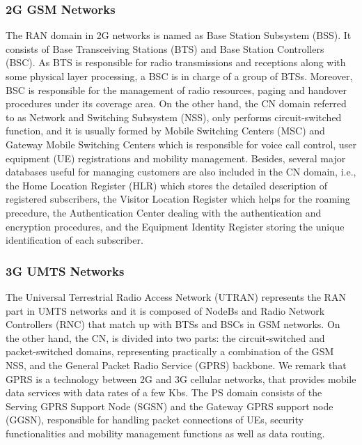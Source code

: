\subsubsection*{2G GSM Networks}
The RAN domain in 2G networks is named as Base Station Subsystem (BSS). It consists of Base Transceiving Stations (BTS) and Base Station Controllers (BSC). As BTS is responsible for radio transmissions and receptions along with some physical layer processing, a BSC is in charge of a group of BTSs. Moreover, BSC is responsible for the management of radio resources, paging and handover procedures under its coverage area. On the other hand, the CN domain referred to as Network and Switching Subsystem (NSS), only performs circuit-switched function, and it is usually formed by Mobile Switching Centers (MSC) and Gateway Mobile Switching Centers which is responsible for voice call control, user equipment (UE) registrations and mobility management. Besides, several major databases useful for managing customers are also included in the CN domain, i.e., the Home Location Register (HLR) which stores the detailed description of registered subscribers, the Visitor Location Register which helps for the roaming precedure, the Authentication Center dealing with the authentication and encryption procedures, and the Equipment Identity Register storing the unique identification of each subscriber.

\subsubsection*{3G UMTS Networks}
The Universal Terrestrial Radio Access Network (UTRAN) represents the RAN part in UMTS networks and it is composed of NodeBs and Radio Network Controllers (RNC) that match up with BTSs and BSCs in GSM networks. On the other hand, the CN, is divided into two parts: the circuit-switched and packet-switched domains, representing practically a combination of the GSM NSS, and the General Packet Radio Service (GPRS) backbone. We remark that GPRS is a technology between 2G and 3G cellular networks, that provides mobile data services with data rates of a few Kb\/s. The PS domain consists of the Serving GPRS Support Node (SGSN) and the Gateway GPRS support node (GGSN), responsible for handling packet connections of UEs, security functionalities and mobility management functions as well as data routing.


